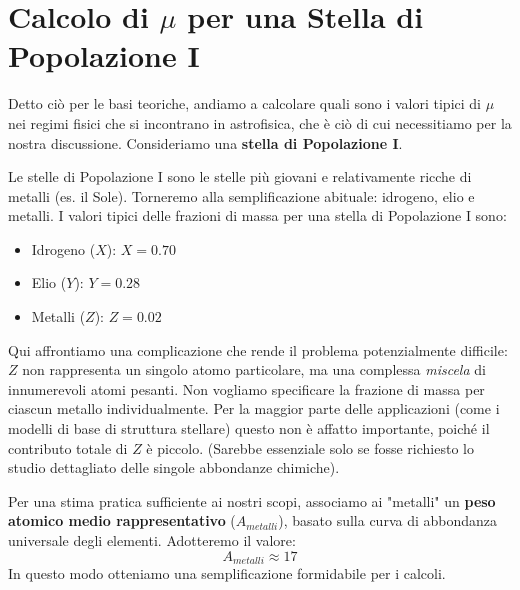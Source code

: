 \section{Calcolo di $\mu$ per una Stella di Popolazione I}

Detto ciò per le basi teoriche, andiamo a calcolare quali sono i valori tipici di $\mu$ nei regimi fisici che si incontrano in astrofisica, che è ciò di cui necessitiamo per la nostra discussione. Consideriamo una \textbf{stella di Popolazione I}.

Le stelle di Popolazione I sono le stelle più giovani e relativamente ricche di metalli (es. il Sole). Torneremo alla semplificazione abituale: idrogeno, elio e metalli. I valori tipici delle frazioni di massa per una stella di Popolazione I sono:
\begin{itemize}
\item Idrogeno ($X$): $X = 0.70$
\item Elio ($Y$): $Y = 0.28$
\item Metalli ($Z$): $Z = 0.02$
\end{itemize}

Qui affrontiamo una complicazione che rende il problema potenzialmente difficile: $Z$ non rappresenta un singolo atomo particolare, ma una complessa \textit{miscela} di innumerevoli atomi pesanti. Non vogliamo specificare la frazione di massa per ciascun metallo individualmente. Per la maggior parte delle applicazioni (come i modelli di base di struttura stellare) questo non è affatto importante, poiché il contributo totale di $Z$ è piccolo. (Sarebbe essenziale solo se fosse richiesto lo studio dettagliato delle singole abbondanze chimiche).

Per una stima pratica sufficiente ai nostri scopi, associamo ai "metalli" un \textbf{peso atomico medio rappresentativo} ($A_{metalli}$), basato sulla curva di abbondanza universale degli elementi. Adotteremo il valore:
\begin{equation}
A_{metalli} \approx 17
\end{equation}
In questo modo otteniamo una semplificazione formidabile per i calcoli.

